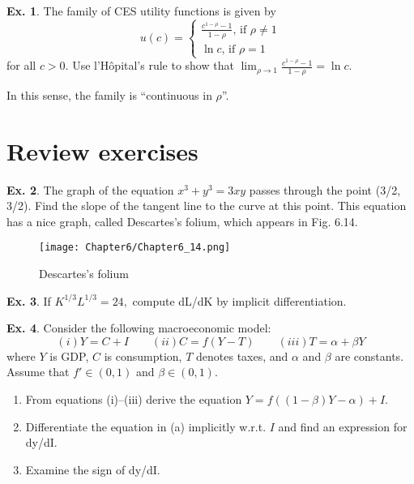 \documentclass[10pt,a4paper]{book}
\theoremstyle{definition}\newtheorem{definition}{Definition}
\theoremstyle{definition}\newtheorem{fact}{Fact}
\theoremstyle{definition}\newtheorem{ex}{Ex.}
\theoremstyle{definition}\newtheorem{project}{Project}
\theoremstyle{definition}\newtheorem{problem}{Problem}
\theoremstyle{definition}\newtheorem{example}{Example}
\numberwithin{theorem}{chapter}
\numberwithin{corollary}{chapter}
\numberwithin{assumption}{chapter}
\numberwithin{definition}{chapter}
\numberwithin{prop}{chapter}
\numberwithin{notation}{chapter}
\numberwithin{problem}{chapter}
\numberwithin{example}{chapter}
\numberwithin{fact}{chapter}
\numberwithin{ex}{chapter}
\begin{document}
	\begin{ex}
		The family of CES utility functions is given by
		$$u(c) = \begin{cases}
			\frac{c^{1-\rho}-1}{1-\rho} \text{,    if } \rho \neq 1 \\
			\ln c \text{,   if } \rho = 1
		\end{cases}$$
		for all $c>0$. Use l’Hôpital’s rule to show that $\lim_{\rho \rightarrow 1} \frac{c^{1-\rho}-1}{1-\rho} = \ln c$. 
		
		In this sense, the family is “continuous in $\rho$”.
	\end{ex}
	
	\section{Review exercises}
	
	\begin{ex}
		The graph of the equation $x^3 + y^3 = 3xy$ passes through the point (3/2, 3/2). Find the slope of the tangent line to the curve at this point. This equation has a nice graph, called Descartes’s folium, which appears in Fig. 6.14.
		
		\begin{figure}[H]
			\centering
			\texttt{[image: Chapter6/Chapter6\_14.png]}
			\caption{Descartes’s folium}
		\end{figure}
	\end{ex}
	
	\begin{ex}
		If $K^{1/3}L^{1/3} = 24,$ compute dL/dK by implicit differentiation.
	\end{ex}
	
	\begin{ex}
		Consider the following macroeconomic model:
		\begin{equation*}
			(i) Y = C + I \qquad
			(ii) C = f (Y - T ) \qquad
			(iii) T = \alpha + \beta Y
		\end{equation*}
		where $Y$ is GDP, $C$ is consumption, $T$ denotes taxes, and $\alpha$ and $\beta$ are constants. Assume that $f' \in (0,1)$ and $\beta \in (0,1)$.
		\begin{enumerate}[label=(\alph*)]
			\item From equations (i)–(iii) derive the equation $Y = f ((1 - \beta)Y - \alpha) + I$.
			\item Differentiate the equation in (a) implicitly w.r.t. $I$ and find an expression for dy/dI.
			\item Examine the sign of dy/dI.
		\end{enumerate}
	\end{ex}
	
\end{document}
